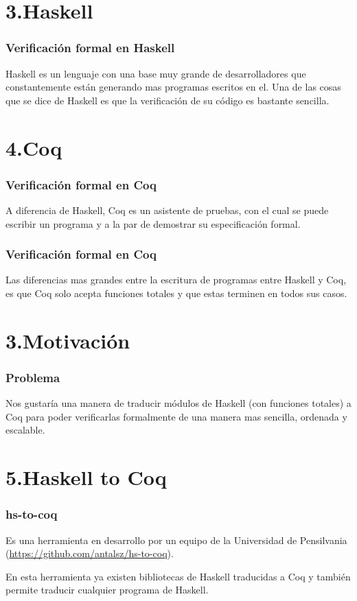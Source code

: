 \documentclass[xcolor=dvipsnames,table,handout]{beamer}
\begin{document}
\section{3.Haskell}
\begin{frame}
  \frametitle{Verificación formal en Haskell}
    Haskell es un lenguaje con una base muy grande de desarrolladores que constantemente están generando mas programas escritos en el.
    \newline Una de las cosas que se dice de Haskell es que la verificación de su código es bastante sencilla.

\newline{}
\end{frame}

\section{4.Coq}
\begin{frame}
  \frametitle{Verificación formal en Coq}
	A diferencia de Haskell, Coq es un asistente de pruebas, con el cual se puede escribir un programa y a la par de demostrar su especificación formal.
\end{frame}

\begin{frame}
  \frametitle{Verificación formal en Coq}
    Las diferencias mas grandes entre la escritura de programas entre Haskell y Coq, es que Coq solo acepta funciones totales y que estas terminen en todos sus casos.
\end{frame}
\section{3.Motivación}
\begin{frame}
  \frametitle{Problema}
       Nos gustaría una manera de traducir módulos de Haskell (con funciones totales) a Coq para poder verificarlas formalmente de una manera mas sencilla, ordenada y escalable.
\end{frame}
\section{5.Haskell to Coq}
\begin{frame}
  \frametitle{hs-to-coq}
       Es una herramienta en desarrollo por un equipo de la Universidad de Pensilvania (\url{https://github.com/antalsz/hs-to-coq}).

       En esta herramienta ya existen bibliotecas de Haskell traducidas a Coq y también permite traducir cualquier programa de Haskell.
\end{frame}
\end{document}
